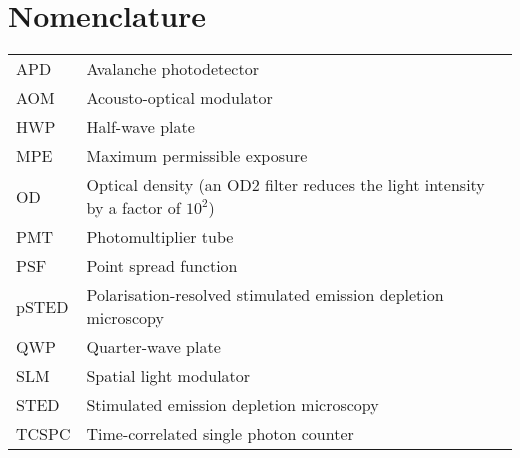 \chapter*{Nomenclature}

\begin{tabular}{ll}
	APD   & Avalanche photodetector                                        \\
	AOM   & Acousto-optical modulator                                      \\
	HWP   & Half-wave plate         \\
	MPE & Maximum permissible exposure                        \\
	OD & Optical density  (an OD2 filter reduces the light intensity by a factor of $ 10^2 $)             \\
	PMT   & Photomultiplier tube                                           \\
	PSF   & Point spread function                                          \\
	pSTED & Polarisation-resolved stimulated emission depletion microscopy \\
	QWP   & Quarter-wave plate                                             \\
	SLM   & Spatial light modulator                                        \\
	STED  & Stimulated emission depletion  microscopy                                \\
	TCSPC & Time-correlated single photon counter
\end{tabular}
